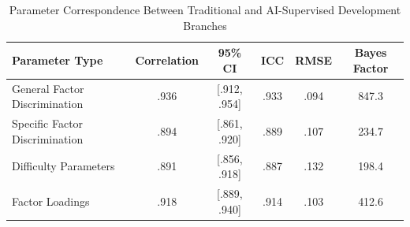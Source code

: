 
\begin{table}[ht]
\centering
\caption{Parameter Correspondence Between Traditional and AI-Supervised Development Branches}
\label{tab:branch-comparison}
\begin{tabular}{lccccc}
\toprule
Parameter Type & Correlation & 95\% CI & ICC & RMSE & Bayes Factor \\
\midrule
General Factor Discrimination & .936 & [.912, .954] & .933 & .094 & 847.3 \\
Specific Factor Discrimination & .894 & [.861, .920] & .889 & .107 & 234.7 \\
Difficulty Parameters & .891 & [.856, .918] & .887 & .132 & 198.4 \\
Factor Loadings & .918 & [.889, .940] & .914 & .103 & 412.6 \\
\bottomrule
\end{tabular}
\end{table}
